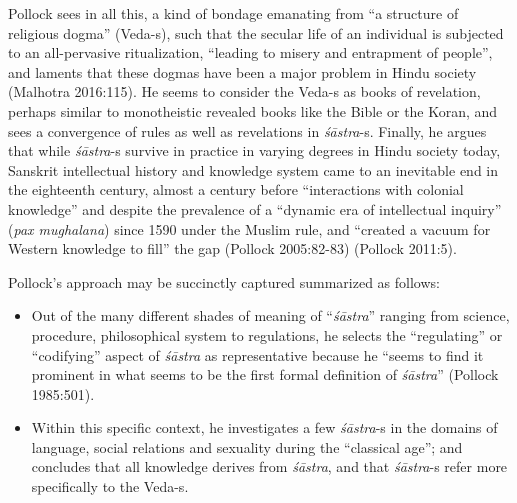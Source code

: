 Pollock sees in all this, a kind of bondage emanating from ``a structure of religious dogma'' (Veda-s), such that the secular life of an individual is subjected to an all-pervasive ritualization, ``leading to misery and entrapment of people'', and laments that these dogmas have been a major problem in Hindu society (Malhotra 2016:115). He seems to consider the Veda-s as books of revelation, perhaps similar to monotheistic revealed books like the Bible or the Koran, and sees a convergence of rules as well as revelations in {\sl śāstra}-s. Finally, he argues that while {\sl śāstra}-s survive in practice in varying degrees in Hindu society today, Sanskrit intellectual history and knowledge system came to an inevitable end in the eighteenth century, almost a century before ``interactions with colonial knowledge'' and despite the prevalence of a ``dynamic era of intellectual inquiry'' ({\sl pax mughalana}) since 1590 under the Muslim rule, and ``created a vacuum for Western knowledge to fill'' the gap (Pollock 2005:82-83) (Pollock 2011:5).

Pollock's approach may be succinctly captured summarized as follows:
\begin{itemize}
\item Out of the many different shades of meaning of ``{\sl śāstra}'' ranging from science, procedure, philosophical system to regulations, he selects the ``regulating'' or ``codifying'' aspect of {\sl śāstra} as representative because he ``seems to find it prominent in what seems to be the first formal definition of {\sl śāstra}'' (Pollock 1985:501).

\item Within this specific context, he investigates a few {\sl śāstra}-s in the domains of language, social relations and sexuality during the ``classical age''; and concludes that all knowledge derives from {\sl śāstra}, and that {\sl śāstra}-s refer more specifically to the Veda-s. 
\end{itemize}

